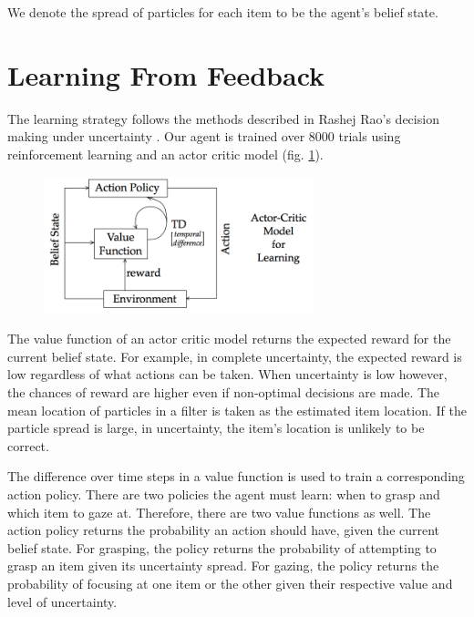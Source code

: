 \documentclass[11]{article}
\begin{document}
We denote the spread of particles for each item to be the agent's belief state. 

\section{Learning From Feedback}
The learning strategy follows the methods described in Rashej Rao's decision making under uncertainty \cite{rashejrao}.
Our agent is trained over 8000 trials using reinforcement learning and an actor critic model (fig. \ref{fig:actor-critic}). 
\begin{figure}[h]
	\centering
	\includegraphics[width=0.7\textwidth]{figures/actorcritic.png}
	\caption{}
	\label{fig:actor-critic}
\end{figure} 

The value function of an actor critic model returns the expected reward for the current belief state.
For example, in complete uncertainty, the expected reward is low regardless of what actions can be taken.
When uncertainty is low however, the chances of reward are higher even if non-optimal decisions are made.  
The mean location of particles in a filter is taken as the estimated item location.
If the particle spread is large, in uncertainty, the item's location is unlikely to be correct. 

The difference over time steps in a value function is used to train a corresponding action policy.
There are two policies the agent must learn: when to grasp and which item to gaze at.
Therefore, there are two value functions as well. 
The action policy returns the probability an action should have, given the current belief state.
For grasping, the policy returns the probability of attempting to grasp an item given its uncertainty spread.
For gazing, the policy returns the probability of focusing at one item or the other given their respective value and level of uncertainty.
\end{document}
